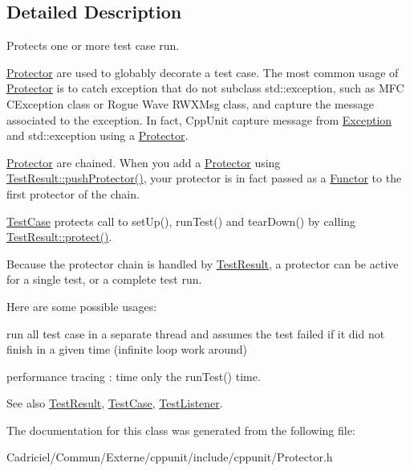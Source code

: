 \subsection{Detailed Description}
Protects one or more test case run. 

\hyperlink{class_protector}{Protector} are used to globably \textquotesingle{}decorate\textquotesingle{} a test case. The most common usage of \hyperlink{class_protector}{Protector} is to catch exception that do not subclass std\+::exception, such as M\+FC C\+Exception class or Rogue Wave R\+W\+X\+Msg class, and capture the message associated to the exception. In fact, Cpp\+Unit capture message from \hyperlink{class_exception}{Exception} and std\+::exception using a \hyperlink{class_protector}{Protector}.

\hyperlink{class_protector}{Protector} are chained. When you add a \hyperlink{class_protector}{Protector} using \hyperlink{class_test_result_a1a4fbbca38cb73e8e00905193b7593dc}{Test\+Result\+::push\+Protector()}, your protector is in fact passed as a \hyperlink{class_functor}{Functor} to the first protector of the chain.

\hyperlink{class_test_case}{Test\+Case} protects call to set\+Up(), run\+Test() and tear\+Down() by calling \hyperlink{class_test_result_a243b3097a3d9468abc61e7910bbaa8b7}{Test\+Result\+::protect()}.

Because the protector chain is handled by \hyperlink{class_test_result}{Test\+Result}, a protector can be active for a single test, or a complete test run.

Here are some possible usages\+:
\begin{DoxyItemize}
\item run all test case in a separate thread and assumes the test failed if it did not finish in a given time (infinite loop work around)
\item performance tracing \+: time only the run\+Test() time. \begin{DoxySeeAlso}{See also}
\hyperlink{class_test_result}{Test\+Result}, \hyperlink{class_test_case}{Test\+Case}, \hyperlink{class_test_listener}{Test\+Listener}. 
\end{DoxySeeAlso}

\end{DoxyItemize}

The documentation for this class was generated from the following file\+:\begin{DoxyCompactItemize}
\item 
Cadriciel/\+Commun/\+Externe/cppunit/include/cppunit/Protector.\+h\end{DoxyCompactItemize}
